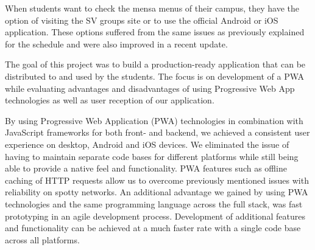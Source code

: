 \begin{markdown}
When students want to check the mensa menus of their campus, they have the option of visiting the SV groups site \cite{SVSite} or to use the official Android or iOS application. These options suffered from the same issues as previously explained for the schedule and were also improved in a recent update.

The goal of this project was to build a production-ready application that can be distributed to and used by the students. The focus is on development of a PWA while evaluating advantages and disadvantages of using Progressive Web App technologies as well as user reception of our application.

By using Progressive Web Application (PWA) technologies \cite{PWA} in combination with JavaScript frameworks for both front- and backend, we achieved a consistent user experience on desktop, Android and iOS devices. We eliminated the issue of having to maintain separate code bases for different platforms while still being able to provide a native feel and functionality. PWA features such as offline caching of HTTP requests allow us to overcome previously mentioned issues with reliability on spotty networks. An additional advantage we gained by using PWA technologies and the same programming language across the full stack, was fast prototyping in an agile development process. Development of additional features and functionality can be achieved at a much faster rate with a single code base across all platforms.

\newpage

\end{markdown}
